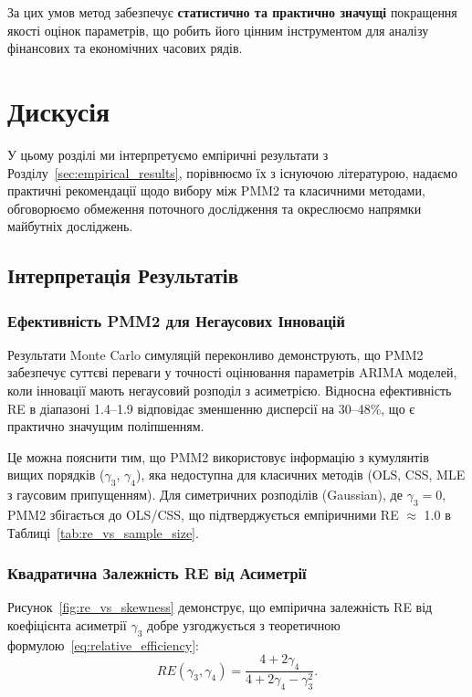 \documentclass[12pt,a4paper]{article}
\begin{document}
За цих умов метод забезпечує \textbf{статистично та практично значущі} покращення якості оцінок параметрів, що робить його цінним інструментом для аналізу фінансових та економічних часових рядів.

\section{Дискусія}
\label{sec:discussion}

У цьому розділі ми інтерпретуємо емпіричні результати з Розділу~\ref{sec:empirical_results}, порівнюємо їх з існуючою літературою, надаємо практичні рекомендації щодо вибору між PMM2 та класичними методами, обговорюємо обмеження поточного дослідження та окреслюємо напрямки майбутніх досліджень.

\subsection{Інтерпретація Результатів}
\label{subsec:interpretation}

\subsubsection{Ефективність PMM2 для Негаусових Інновацій}

Результати Monte Carlo симуляцій переконливо демонструють, що PMM2 забезпечує суттєві переваги у точності оцінювання параметрів ARIMA моделей, коли інновації мають негаусовий розподіл з асиметрією. Відносна ефективність RE в діапазоні 1.4--1.9 відповідає зменшенню дисперсії на 30--48\%, що є практично значущим поліпшенням.

Це можна пояснити тим, що PMM2 використовує інформацію з кумулянтів вищих порядків ($\gamma_3$, $\gamma_4$), яка недоступна для класичних методів (OLS, CSS, MLE з гаусовим припущенням). Для симетричних розподілів (Gaussian), де $\gamma_3 = 0$, PMM2 збігається до OLS/CSS, що підтверджується емпіричними RE $\approx$ 1.0 в Таблиці~\ref{tab:re_vs_sample_size}.

\subsubsection{Квадратична Залежність RE від Асиметрії}

Рисунок~\ref{fig:re_vs_skewness} демонструє, що емпірична залежність RE від коефіцієнта асиметрії $\gamma_3$ добре узгоджується з теоретичною формулою~\eqref{eq:relative_efficiency}:
\begin{equation}
    RE(\gamma_3, \gamma_4) = \frac{4 + 2\gamma_4}{4 + 2\gamma_4 - \gamma_3^2}.
\end{equation}
\end{document}
